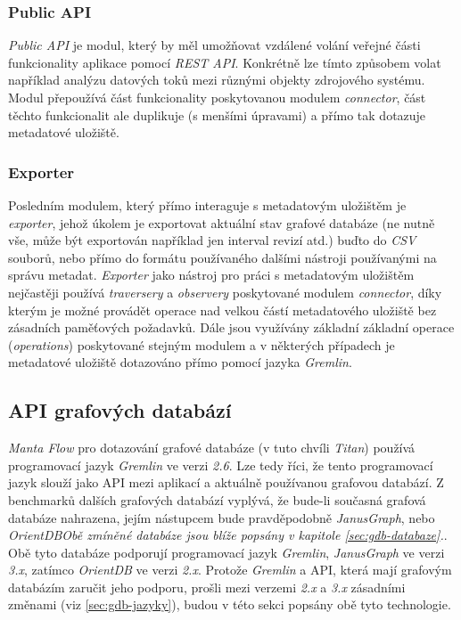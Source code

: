 \subsubsection{Public API}
\label{sec:ana_public}
\textit{Public API} je modul, který by měl umožňovat vzdálené volání veřejné části funkcionality aplikace pomocí \textit{REST API}. Konkrétně lze tímto způsobem volat například analýzu datových toků mezi různými objekty zdrojového systému. Modul přepoužívá část funkcionality poskytovanou modulem \textit{connector}, část těchto funkcionalit ale duplikuje (s menšími úpravami) a přímo tak dotazuje metadatové uložiště.    

\subsubsection{Exporter}
\label{sec:ana_exporter}
Posledním modulem, který přímo interaguje s metadatovým uložištěm je \textit{exporter}, jehož úkolem je exportovat aktuální stav grafové databáze (ne nutně vše, může být exportován například jen interval revizí atd.) buďto do \textit{CSV} souborů, nebo přímo do formátu používaného dalšími nástroji používanými na správu metadat. \textit{Exporter} jako nástroj pro práci s metadatovým uložištěm nejčastěji používá \textit{traversery} a \textit{observery} poskytované modulem \textit{connector}, díky kterým je možné provádět operace nad velkou částí metadatového uložiště bez zásadních paměťových požadavků. Dále jsou využívány základní základní operace (\textit{operations}) poskytované stejným modulem a v některých případech je metadatové uložiště dotazováno přímo pomocí jazyka \textit{Gremlin}.


\subsection{API grafových databází}
\label{sec:ana_gdbapi}
\textit{Manta Flow} pro dotazování grafové databáze (v tuto chvíli \textit{Titan}) používá programovací jazyk \textit{Gremlin} ve verzi \textit{2.6}. Lze tedy říci, že tento programovací jazyk slouží jako API mezi aplikací a aktuálně používanou grafovou databází. Z benchmarků dalších grafových databází \cite{Kovar18} vyplývá, že bude-li současná grafová databáze nahrazena, jejím nástupcem bude pravděpodobně \textit{JanusGraph}, nebo \textit{OrientDB}\textit{Obě zmíněné databáze jsou blíže popsány v kapitole \ref{sec:gdb-databaze}.}. Obě tyto databáze podporují programovací jazyk \textit{Gremlin}, \textit{JanusGraph} ve verzi \textit{3.x}, zatímco \textit{OrientDB} ve verzi \textit{2.x}. Protože \textit{Gremlin} a API, která mají grafovým databázím zaručit jeho podporu, prošli mezi verzemi \textit{2.x} a \textit{3.x} zásadními změnami (viz \ref{sec:gdb-jazyky}), budou v této sekci popsány obě tyto technologie.

